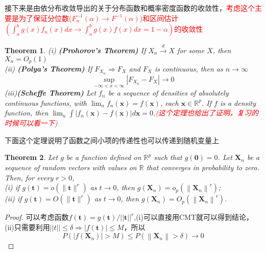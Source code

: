 \documentclass{article}
\newtheorem{theorem}{Theorem}[section]
\newtheorem*{proof}{Proof}
\begin{document}
\par 接下来是由依分布收敛导出的关于分布函数和概率密度函数的收敛性，\textcolor{red}{考虑这个主要是为了保证分位数($F_n^{-1}(\alpha)\to F^{-1}(\alpha)$)和区间估计$(\int_{a}^{b}g(x)f_n(x)dx\to \int_{a}^{b}g(x)f(x)dx=1-\alpha)$的收敛性}
\begin{theorem}
	(i) \textbf{(Prohorov's Theorem)} If $X_n \stackrel{d}{\rightarrow} X$ for some $X$, then $X_n=O_p(1)$\\
	(ii) \textbf{(Polya's Theorem)} If $F_{X_n} \Rightarrow F_X$ and $F_X$ is continuous, then as $n \rightarrow \infty$
	$$
	\sup _{-\infty<x<\infty}\left|F_{X_n}-F_X\right| \rightarrow 0
	$$
	(iii)\textbf{(Scheffe Theorem)} Let $f_n$ be a sequence of densities of absolutely continuous functions, with $\lim _n f_n(\mathbf{x})=f(\mathbf{x})$, each $\mathbf{x} \in \mathbb{R}^p$. If $f$ is a density function, then $\lim _n \int\left|f_n(\mathbf{x})-f(\mathbf{x})\right| d \mathbf{x}=0$.\textcolor{red}{(这个定理也给出了证明，复习的时候可以看一下)}
\end{theorem}
下面这个定理说明了函数之间小项的传递性也可以传递到随机变量上
\begin{theorem}
	\label{小项的传递性}
	Let $g$ be a function defined on $\mathbb{R}^p$ such that $g(\mathbf{0})=0$. Let $\mathbf{X}_n$ be a sequence of random vectors with values on $\mathbb{R}$ that converges in probability to zero. Then, for every $r>0$,\\
	(i) if $g(\mathbf{t})=o\left(\|\mathbf{t}\|^r\right)$ as $t \rightarrow 0$, then $g\left(\mathbf{X}_n\right)=o_p\left(\left\|\mathbf{X}_n\right\|^r\right)$;\\
	(ii) if $g(\mathbf{t})=O\left(\|\mathbf{t}\|^r\right)$ as $t \rightarrow 0$, then $g\left(\mathbf{X}_n\right)=O_p\left(\left\|\mathbf{X}_n\right\|^r\right)$.
\end{theorem}
\begin{proof}
	可以考虑函数$f(\mathbf{t})=g(\mathbf{t})/||\mathbf{t}||^{r}$,(i)可以直接用CMT就可以得到结论，(ii)只需要利用$||t||\leq \delta\Rightarrow |f(\mathbf{t})|\leq M$，所以
	$$
	P\left(\left|f\left(\mathbf{X}_n\right)\right|>M\right) \leq P\left(\left\|\mathbf{X}_n\right\|>\delta\right) \rightarrow 0
	$$
\end{proof}
\end{document}
